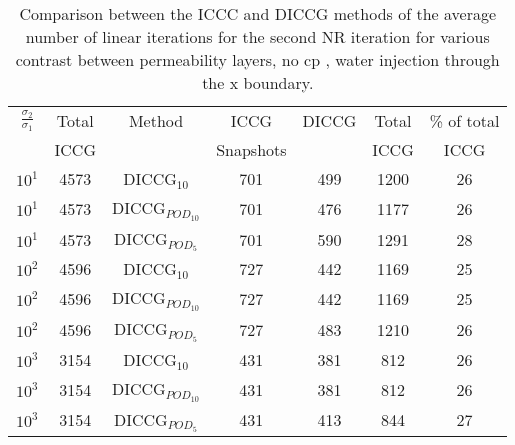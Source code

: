 \documentclass[a4paper,10pt]{report}
\begin{document}
\begin{table}[!ht]\centering
\begin{minipage}{1\textwidth}
 \centering
\begin{tabular}{ ||c|c||c|c|c|c|c||} 
\hline
$\frac{\sigma_2}{\sigma_1}$&Total&Method  & ICCG&DICCG &Total&\% of total\\ 
                           & ICCG     &  & Snapshots& &ICCG& ICCG\\ 
 \hline 
$10^{1}$ &4573& DICCG$_{10}$&701&499&1200&26\\ 
\hline  
$10^{1}$ &4573& DICCG$_{POD_{10}}$&701&476&1177&26 \\ 
\hline  
$10^{1}$ &4573& DICCG$_{POD_{5}}$&701&590&1291&28 \\ 
\hline 
$10^{2}$ &4596& DICCG$_{10}$&727&442&1169&25\\ 
\hline  
$10^{2}$ &4596& DICCG$_{POD_{10}}$&727&442&1169&25 \\ 
\hline  
$10^{2}$ &4596& DICCG$_{POD_{5}}$&727&483&1210&26 \\ 
\hline   
$10^{3}$ &3154& DICCG$_{10}$&431&381&812&26\\ 
\hline  
$10^{3}$ &3154& DICCG$_{POD_{10}}$&431&381&812&26 \\ 
\hline  
$10^{3}$ &3154& DICCG$_{POD_{5}}$&431&413&844&27 \\ 
\hline 
\end{tabular} 
\caption{Comparison between the ICCC and DICCG methods of the average number of linear iterations for the second NR iteration for various contrast between permeability layers, no cp , water injection through the x boundary. }\label{table:litertot2} 
\end{minipage}  
\end{table}  
\end{document}
